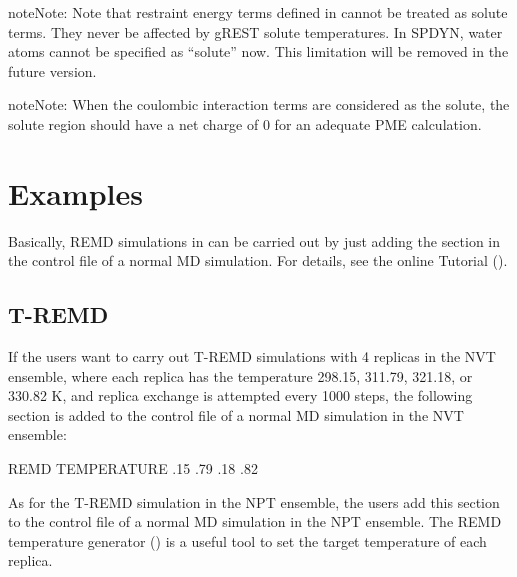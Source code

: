 \documentclass[a4paper,11pt,oneside,english]{sphinxmanual}
\begin{document}
\begin{sphinxadmonition}{note}{Note:}
Note that restraint energy terms defined in \sphinxstylestrong{{[}RESTRAINTS{]}}
cannot be treated as solute terms.
They never be affected by gREST solute temperatures.
In SPDYN, water atoms cannot be specified as “solute” now.
This limitation will be removed in the future version.
\end{sphinxadmonition}

\begin{sphinxadmonition}{note}{Note:}
When the coulombic interaction terms are considered as the solute,
the solute region should have a net charge of 0 for an adequate
PME calculation.
\end{sphinxadmonition}


\section{Examples}
\label{\detokenize{14_REMD:examples}}
Basically, REMD simulations in  can be carried out by
just adding the \sphinxstylestrong{{[}REMD{]}} section
in the control file of a normal MD simulation.
For details, see the online Tutorial ().


\subsection{T-REMD}
\label{\detokenize{14_REMD:t-remd}}
If the users want to carry out T-REMD simulations with 4 replicas in the NVT ensemble,
where each replica has the temperature 298.15, 311.79, 321.18, or 330.82 K,
and replica exchange is attempted every 1000 steps,
the following section is added to the control file of a normal MD simulation in the NVT ensemble:

\begin{sphinxVerbatim}[commandchars=\\\{\}]
\PYG{o}{[}REMD\PYG{o}{]}
        
  
            TEMPERATURE
        
      .15 .79 .18 .82
\end{sphinxVerbatim}

As for the T-REMD simulation in the NPT ensemble, the users add this section
to the control file of a normal MD simulation in the NPT ensemble.
The REMD temperature generator () is
a useful tool to set the target temperature of each replica.
\end{document}
